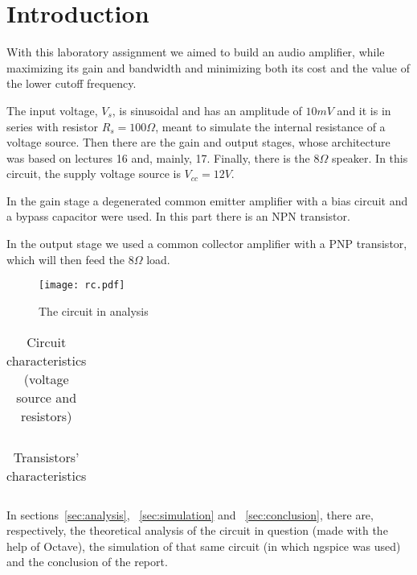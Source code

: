 \section{Introduction}
\label {sec:introduction}


With this laboratory assignment we aimed to build an audio amplifier, while maximizing its gain and bandwidth and minimizing both its cost and the value of the lower cutoff frequency.

The input voltage, $V_s$, is sinusoidal and has an amplitude of $10 mV$ and it is in series with resistor $R_s=100 \Omega$, meant to simulate the internal resistance of a voltage source. Then there are the gain and output stages, whose architecture was based on lectures 16 and, mainly, 17. Finally, there is the $8 \Omega$ speaker. In this circuit, the supply voltage source is $V_{cc}=12 V$.

In the gain stage a degenerated common emitter amplifier with a bias circuit and a bypass capacitor were used. In this part there is an NPN transistor.

In the output stage we used a common collector amplifier with a PNP transistor, which will then feed the $8 \Omega$ load.



\begin{figure}[H] \centering
\texttt{[image: rc.pdf]}
\caption{The circuit in analysis}
\label{fig:circuit}
\end{figure}


\begin{table}[H]
  \centering
  \begin{tabular}{|c|c|}
    \hline
      
  \end{tabular}
  \caption{Circuit characteristics (voltage source and resistors)}
  \label{tab:resistance}
\end{table}

\begin{table}[H]
  \centering
  \begin{tabular}{|c|c|}
    \hline
      
  \end{tabular}
  \caption{Transistors' characteristics}
  \label{tab:resistance1}
\end{table}

In sections~\ref{sec:analysis}, ~\ref{sec:simulation} and ~\ref{sec:conclusion}, there are, respectively, the theoretical analysis of the circuit in question (made with the help of Octave), the simulation of that same circuit (in which ngspice was used) and the conclusion of the report.
